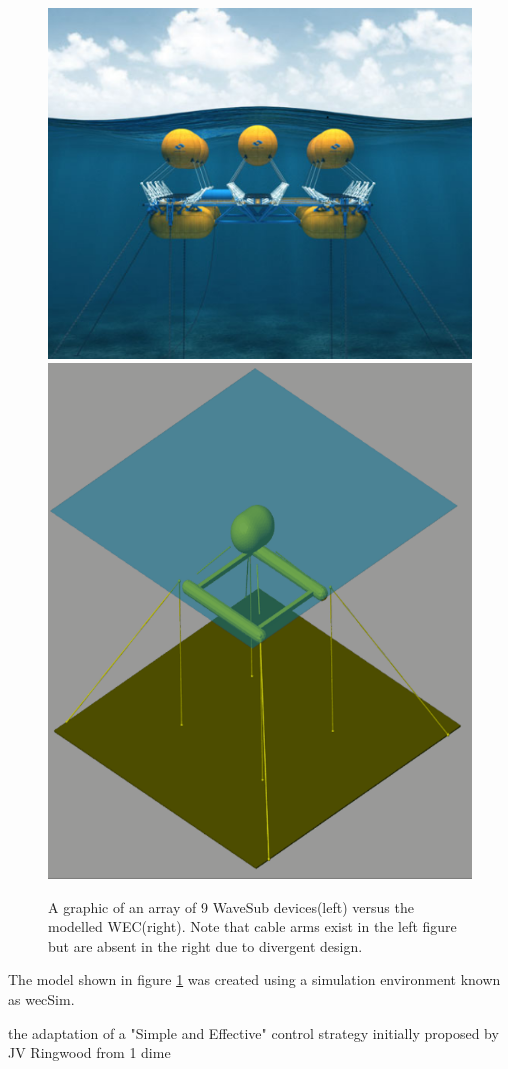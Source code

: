 \documentclass{report}
\begin{document}
\begin{figure}
\centering
\includegraphics[height=0.4\textwidth]{graphics/waveSub}
\includegraphics[height=0.4\textwidth]{graphics/wecSimFloat}
\label{fig:waveSub}
\caption{A graphic of an array of 9 WaveSub devices(left)\cite{waveSub} versus the modelled WEC(right). Note that cable arms exist in the left figure but are absent in the right due to divergent design.}
\end{figure}

The model shown in figure \ref{fig:waveSub}  was created using a simulation environment known as wecSim\cite{wecSim}.
 
 the adaptation of a "Simple and Effective" control strategy initially proposed by JV Ringwood \cite{ringwood} from 1 dime
\end{document}
